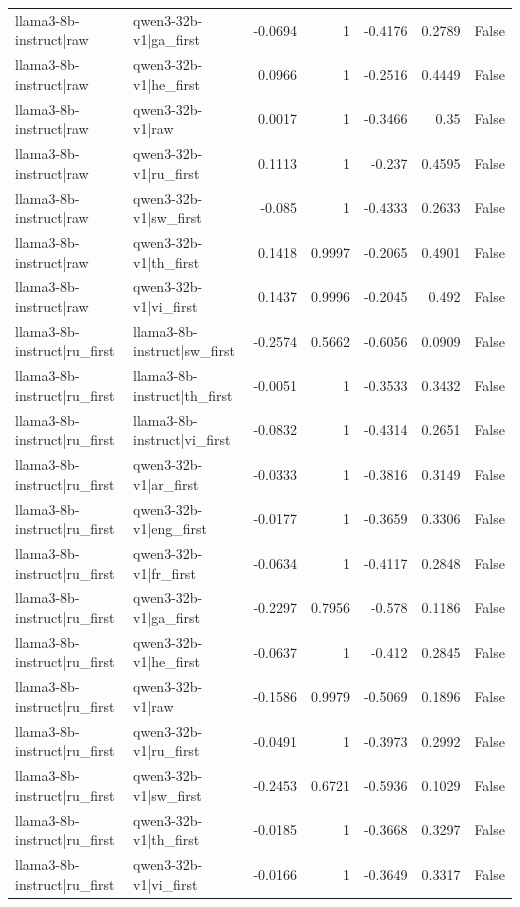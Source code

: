 \begin{table}
\begin{tabular}{l l r r r r l}
llama3-8b-instruct|raw & qwen3-32b-v1|ga_first & -0.0694 & 1 & -0.4176 & 0.2789 & False \\
llama3-8b-instruct|raw & qwen3-32b-v1|he_first & 0.0966 & 1 & -0.2516 & 0.4449 & False \\
llama3-8b-instruct|raw & qwen3-32b-v1|raw & 0.0017 & 1 & -0.3466 & 0.35 & False \\
llama3-8b-instruct|raw & qwen3-32b-v1|ru_first & 0.1113 & 1 & -0.237 & 0.4595 & False \\
llama3-8b-instruct|raw & qwen3-32b-v1|sw_first & -0.085 & 1 & -0.4333 & 0.2633 & False \\
llama3-8b-instruct|raw & qwen3-32b-v1|th_first & 0.1418 & 0.9997 & -0.2065 & 0.4901 & False \\
llama3-8b-instruct|raw & qwen3-32b-v1|vi_first & 0.1437 & 0.9996 & -0.2045 & 0.492 & False \\
llama3-8b-instruct|ru_first & llama3-8b-instruct|sw_first & -0.2574 & 0.5662 & -0.6056 & 0.0909 & False \\
llama3-8b-instruct|ru_first & llama3-8b-instruct|th_first & -0.0051 & 1 & -0.3533 & 0.3432 & False \\
llama3-8b-instruct|ru_first & llama3-8b-instruct|vi_first & -0.0832 & 1 & -0.4314 & 0.2651 & False \\
llama3-8b-instruct|ru_first & qwen3-32b-v1|ar_first & -0.0333 & 1 & -0.3816 & 0.3149 & False \\
llama3-8b-instruct|ru_first & qwen3-32b-v1|eng_first & -0.0177 & 1 & -0.3659 & 0.3306 & False \\
llama3-8b-instruct|ru_first & qwen3-32b-v1|fr_first & -0.0634 & 1 & -0.4117 & 0.2848 & False \\
llama3-8b-instruct|ru_first & qwen3-32b-v1|ga_first & -0.2297 & 0.7956 & -0.578 & 0.1186 & False \\
llama3-8b-instruct|ru_first & qwen3-32b-v1|he_first & -0.0637 & 1 & -0.412 & 0.2845 & False \\
llama3-8b-instruct|ru_first & qwen3-32b-v1|raw & -0.1586 & 0.9979 & -0.5069 & 0.1896 & False \\
llama3-8b-instruct|ru_first & qwen3-32b-v1|ru_first & -0.0491 & 1 & -0.3973 & 0.2992 & False \\
llama3-8b-instruct|ru_first & qwen3-32b-v1|sw_first & -0.2453 & 0.6721 & -0.5936 & 0.1029 & False \\
llama3-8b-instruct|ru_first & qwen3-32b-v1|th_first & -0.0185 & 1 & -0.3668 & 0.3297 & False \\
llama3-8b-instruct|ru_first & qwen3-32b-v1|vi_first & -0.0166 & 1 & -0.3649 & 0.3317 & False \\

\end{tabular}
\end{table}
